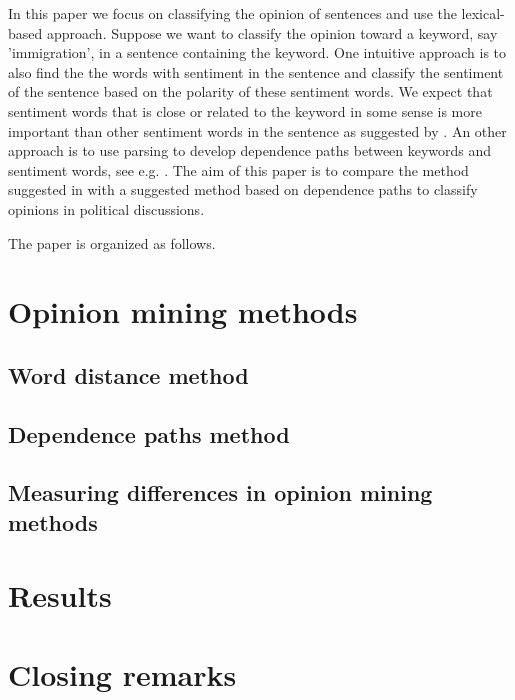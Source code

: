 \documentclass[a4paper, 12pt]{article}
\begin{document}
In this paper we focus on classifying the opinion of sentences and use the lexical-based approach. Suppose we want to classify the opinion toward a keyword, say 'immigration', in a sentence containing the keyword. One intuitive approach is to also find the the words with sentiment in the sentence and classify the sentiment of the sentence based on the polarity of these sentiment words. We expect that sentiment words that is close or related to the keyword in some sense is more important than other sentiment words in the sentence as suggested by \citet{Ding08}. An other approach is to use parsing to develop dependence paths between keywords and sentiment words, see e.g. \citet{Jiang11}. The aim of this paper is to compare the method suggested in \citet{Ding08} with a suggested method based on dependence paths to classify opinions in political discussions.

The paper is organized as follows. 

\section{Opinion mining methods}
\label{sec:om}

\subsection{Word distance method}
\label{sec:wd}

\subsection{Dependence paths method}
\label{sec:dp}

\subsection{Measuring differences in opinion mining methods}
\label{sec:diff}

\section{Results}
\label{sec:results}

\section{Closing remarks}
\label{sec:cr}


\end{document}
